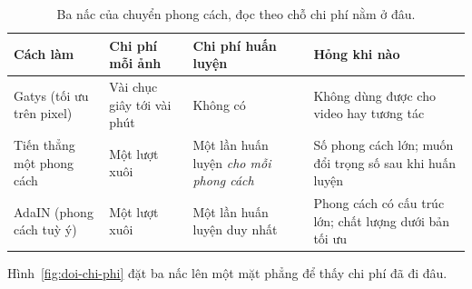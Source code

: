 \documentclass[../../../deep_learning.tex]{subfiles}
\begin{document}
\begin{table}[H]\centering\small
\caption{Ba nấc của chuyển phong cách, đọc theo chỗ chi phí nằm ở đâu.}
\label{tab:ba-nac-nst}
\begin{tabularx}{\linewidth}{@{}L{2.6cm}L{2.5cm}L{2.5cm}Y@{}}
\toprule
\textbf{Cách làm} & \textbf{Chi phí mỗi ảnh} & \textbf{Chi phí huấn luyện} & \textbf{Hỏng khi nào}\\
\midrule
Gatys (tối ưu trên pixel) & Vài chục giây tới vài phút & Không có & Không dùng được cho video hay tương tác\\
Tiến thẳng một phong cách & Một lượt xuôi & Một lần huấn luyện \emph{cho mỗi phong cách} & Số phong cách lớn; muốn đổi trọng số sau khi huấn luyện\\
AdaIN (phong cách tuỳ ý) & Một lượt xuôi & Một lần huấn luyện duy nhất & Phong cách có cấu trúc lớn; chất lượng dưới bản tối ưu\\
\bottomrule
\end{tabularx}
\end{table}

Hình~\ref{fig:doi-chi-phi} đặt ba nấc lên một mặt phẳng để thấy chi phí đã đi đâu.
\end{document}
